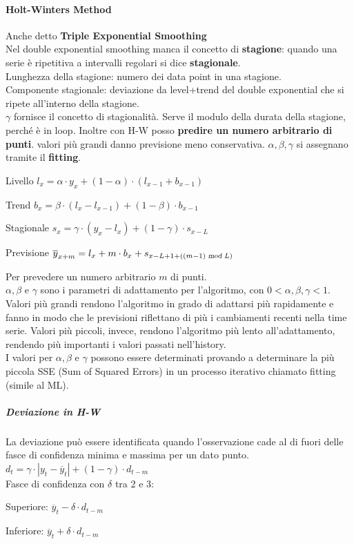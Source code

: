 \documentclass[10pt]{book}
\begin{document}
\paragraph{Holt-Winters Method} Anche detto \textbf{Triple Exponential Smoothing}\\
Nel double exponential smoothing manca il concetto di \textbf{stagione}: quando una serie è ripetitiva a intervalli regolari si dice \textbf{stagionale}.\\
Lunghezza della stagione: numero dei data point in una stagione.\\
Componente stagionale: deviazione da level+trend del double exponential che si ripete all'interno della stagione.\\
$\gamma$ fornisce il concetto di stagionalità. Serve il modulo della durata della stagione, perché è in loop. Inoltre con H-W posso \textbf{predire un numero arbitrario di punti}. valori più grandi danno previsione meno conservativa. $\alpha, \beta, \gamma$ si assegnano tramite il \textbf{fitting}.
\begin{list}{}{}
	\item Livello $l_x = \alpha\cdot y_x + (1-\alpha)\cdot(l_{x-1} + b_{x-1})$
	\item Trend $b_x = \beta\cdot (l_x - l_{x-1}) + (1-\beta)\cdot b_{x-1}$
	\item Stagionale $s_x = \gamma\cdot (y_x - l_x) + (1-\gamma)\cdot s_{x-L}$
	\item Previsione $\overline{y}_{x+m} = l_x + m\cdot b_x + s_{x - L + 1 + ((m-1)\textsl{ mod }L)}$
\end{list}
Per prevedere un numero arbitrario $m$ di punti.\\
$\alpha,\beta$ e $\gamma$ sono i parametri di adattamento per l'algoritmo, con $0<\alpha,\beta,\gamma < 1$. Valori più grandi rendono l'algoritmo in grado di adattarsi più rapidamente e fanno in modo che le previsioni riflettano di più i cambiamenti recenti nella time serie. Valori più piccoli, invece, rendono l'algoritmo più lento all'adattamento, rendendo più importanti i valori passati nell'history.\\
I valori per $\alpha,\beta$ e $\gamma$ possono essere determinati provando a determinare la più piccola SSE (Sum of Squared Errors) in un processo iterativo chiamato fitting (simile al ML).
\subparagraph{Deviazione in H-W} La deviazione può essere identificata quando l'osservazione cade al di fuori delle fasce di confidenza minima e massima per un dato punto.\\
$d_t = \gamma\cdot |y_t - \overline{y}_t| + (1 - \gamma)\cdot d_{t-m}$\\
Fasce di confidenza con $\delta$ tra 2 e 3:
\begin{list}{}{}
	\item Superiore: $\overline{y}_t - \delta\cdot d_{t-m}$
	\item Inferiore: $\overline{y}_t + \delta\cdot d_{t-m}$
\end{list}
\end{document}
